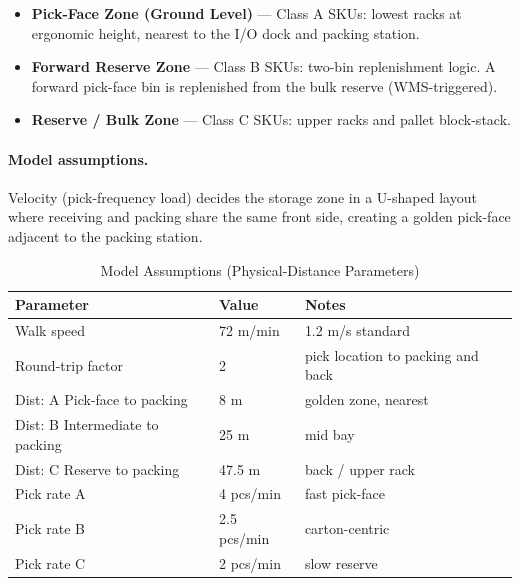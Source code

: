 \documentclass[11pt]{article}
\begin{document}
\begin{itemize}
    \item \textbf{Pick-Face Zone (Ground Level)} --- Class A SKUs: lowest racks at
          ergonomic height, nearest to the I/O dock and packing station.
    \item \textbf{Forward Reserve Zone} --- Class B SKUs: two-bin replenishment logic.
          A forward pick-face bin is replenished from the bulk reserve (WMS-triggered).
    \item \textbf{Reserve / Bulk Zone} --- Class C SKUs: upper racks and pallet block-stack.
\end{itemize}

\paragraph{Model assumptions.}
Velocity (pick-frequency load) decides the storage zone in a U-shaped layout where receiving and packing share the same front side, creating a golden pick-face adjacent to the packing station.

\begin{table}[H]
\centering
\caption{Model Assumptions (Physical-Distance Parameters)}
\begin{tabular}{lll}
\toprule
Parameter & Value & Notes \\
\midrule
        Walk speed & 72 m/min & 1.2 m/s standard \\
        Round-trip factor & 2 & pick location to packing and back \\
        Dist: A Pick-face to packing & 8 m & golden zone, nearest \\
        Dist: B Intermediate to packing & 25 m & mid bay \\
        Dist: C Reserve to packing & 47.5 m & back / upper rack \\
        Pick rate A & 4 pcs/min & fast pick-face \\
        Pick rate B & 2.5 pcs/min & carton-centric \\
        Pick rate C & 2 pcs/min & slow reserve \\
\bottomrule
\end{tabular}
\end{table}
\end{document}
